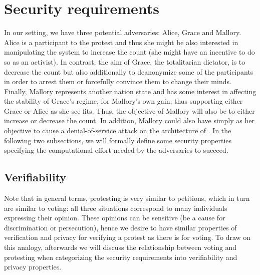 \section{Security requirements}%
\label{Properties}


In our setting, we have three potential adversaries: Alice, Grace and Mallory.
Alice is a participant to the protest and thus she might be also interested in manipulating the system to increase the count (\eg she might have an incentive to do so as an activist).
In contrast, the aim of Grace, the totalitarian dictator, is to decrease the 
count but also additionally to deanonymize some of the participants in order to 
arrest them or forcefully convince them to change their minds.
Finally, Mallory represents another nation state and has some interest in 
affecting the stability of Grace's regime, for Mallory's own gain, thus 
supporting either Grace or Alice as she see fits.
Thus, the objective of Mallory will also be to either increase or decrease the count.
In addition, Mallory could also have simply as her objective to cause a 
denial-of-service attack on the architecture of \PRIVO.
In the following two subsections, we will formally define some security 
properties specifying the computational effort needed by the adversaries to 
succeed.

\subsection{Verifiability}%
\label{Verifiability}

Note that in general terms, protesting is very similar to petitions, which in 
turn are similar to voting: all three situations correspond to many individuals 
expressing their opinion.
These opinions can be sensitive (\eg be a cause for discrimination or persecution), hence we desire to have similar properties of verification and privacy for verifying a protest as there is for voting. 
To draw on this analogy, afterwards we will discuss the relationship between voting and protesting when categorizing the security requirements into verifiability and privacy properties.


